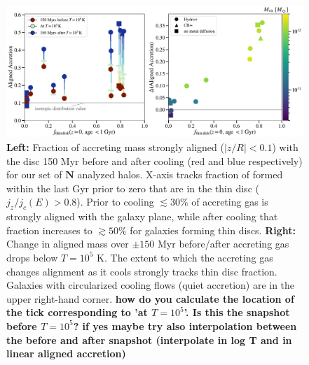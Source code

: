 \documentclass[fleqn,usenatbib]{mnras}
\begin{document}
\begin{figure}
    \centering
    \includegraphics[width=\textwidth]{figures/prevalence/aligned_fraction.pdf}
    \caption{
    \textbf{Left:}
    Fraction of accreting mass strongly aligned ($\mid z/R \mid < 0.1$) with the disc 150 Myr before and after cooling (red and blue respectively) for our set of $\mathbf{N}$ analyzed halos.
    X-axis tracks fraction of formed within the last Gyr prior to zero that are in the thin disc ($j_z/j_c(E)>0.8$).
    Prior to cooling $\lesssim 30\%$ of accreting gas is strongly aligned with the galaxy plane,
    while after cooling that fraction increases to $\gtrsim 50\%$ for galaxies forming thin discs.
    \textbf{Right:}
    Change in aligned mass over $\pm 150$ Myr before/after accreting gas drops below $T = 10^5$ K.
    The extent to which the accreting gas changes alignment as it cools strongly tracks thin disc fraction.
    Galaxies with circularized cooling flows (quiet accretion) are in the upper right-hand corner.
\textbf{how do you calculate the location of the tick corresponding to 'at $T=10^5$'. Is this the snapshot before $T=10^5$? if yes maybe try also interpolation between the before and after snapshot (interpolate in log T and in linear aligned accretion)}
    }
    \label{f: prevalence}
\end{figure}
\end{document}
